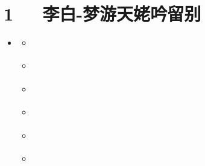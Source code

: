\documentclass[letterpaper,10pt,english]{sphinxmanual}
\begin{document}
\chapter{1   李白-梦游天姥吟留别}
\label{\detokenize{p01_u6563_u6587/_u674e_u767d-_u68a6_u6e38_u5929_u59e5_u541f_u7559_u522b:id1}}\label{\detokenize{p01_u6563_u6587/_u674e_u767d-_u68a6_u6e38_u5929_u59e5_u541f_u7559_u522b::doc}}
\begin{sphinxShadowBox}
\begin{itemize}
\item {} 
\label{\detokenize{p01_u6563_u6587/_u674e_u767d-_u68a6_u6e38_u5929_u59e5_u541f_u7559_u522b:id10}}{\hyperref[\detokenize{p01_u6563_u6587/_u674e_u767d-_u68a6_u6e38_u5929_u59e5_u541f_u7559_u522b:id1}]{}}
\begin{itemize}
\item {} 
\label{\detokenize{p01_u6563_u6587/_u674e_u767d-_u68a6_u6e38_u5929_u59e5_u541f_u7559_u522b:id11}}{\hyperref[\detokenize{p01_u6563_u6587/_u674e_u767d-_u68a6_u6e38_u5929_u59e5_u541f_u7559_u522b:id3}]{}}

\item {} 
\label{\detokenize{p01_u6563_u6587/_u674e_u767d-_u68a6_u6e38_u5929_u59e5_u541f_u7559_u522b:id12}}{\hyperref[\detokenize{p01_u6563_u6587/_u674e_u767d-_u68a6_u6e38_u5929_u59e5_u541f_u7559_u522b:id4}]{}}

\item {} 
\label{\detokenize{p01_u6563_u6587/_u674e_u767d-_u68a6_u6e38_u5929_u59e5_u541f_u7559_u522b:id13}}{\hyperref[\detokenize{p01_u6563_u6587/_u674e_u767d-_u68a6_u6e38_u5929_u59e5_u541f_u7559_u522b:id5}]{}}

\item {} 
\label{\detokenize{p01_u6563_u6587/_u674e_u767d-_u68a6_u6e38_u5929_u59e5_u541f_u7559_u522b:id14}}{\hyperref[\detokenize{p01_u6563_u6587/_u674e_u767d-_u68a6_u6e38_u5929_u59e5_u541f_u7559_u522b:id6}]{}}

\item {} 
\label{\detokenize{p01_u6563_u6587/_u674e_u767d-_u68a6_u6e38_u5929_u59e5_u541f_u7559_u522b:id15}}{\hyperref[\detokenize{p01_u6563_u6587/_u674e_u767d-_u68a6_u6e38_u5929_u59e5_u541f_u7559_u522b:id7}]{}}

\item {} 
\label{\detokenize{p01_u6563_u6587/_u674e_u767d-_u68a6_u6e38_u5929_u59e5_u541f_u7559_u522b:id16}}{\hyperref[\detokenize{p01_u6563_u6587/_u674e_u767d-_u68a6_u6e38_u5929_u59e5_u541f_u7559_u522b:id8}]{}}


\end{itemize}
\end{itemize}
\end{sphinxShadowBox}
\end{document}
